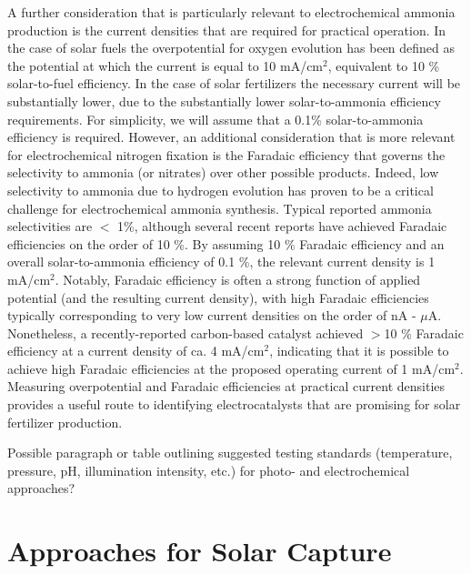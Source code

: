 A further consideration that is particularly relevant to electrochemical ammonia production is the current densities that are required for practical operation. In the case of solar fuels the overpotential for oxygen evolution has been defined as the potential at which the current is equal to 10 mA/cm$^2$, equivalent to 10 \% solar-to-fuel efficiency. In the case of solar fertilizers the necessary current will be substantially lower, due to the substantially lower solar-to-ammonia efficiency requirements. For simplicity, we will assume that a 0.1\% solar-to-ammonia efficiency is required. However, an additional consideration that is more relevant for electrochemical nitrogen fixation is the Faradaic efficiency that governs the selectivity to ammonia (or nitrates) over other possible products. Indeed, low selectivity to ammonia due to hydrogen evolution has proven to be a critical challenge for electrochemical ammonia synthesis. Typical reported ammonia selectivities are $<$ 1\%, although several recent reports have achieved Faradaic efficiencies on the order of 10 \%. By assuming 10 \% Faradaic efficiency and an overall solar-to-ammonia efficiency of 0.1 \%, the relevant current density is 1 mA/cm$^2$. Notably, Faradaic efficiency is often a strong function of applied potential (and the resulting current density), with high Faradaic efficiencies typically corresponding to very low current densities on the order of nA - $\mu$A. Nonetheless, a recently-reported carbon-based catalyst achieved $>$10 \% Faradaic efficiency at a current density of ca. 4 mA/cm$^2$, indicating that it is possible to achieve high Faradaic efficiencies at the proposed operating current of 1 mA/cm$^2$. Measuring overpotential and Faradaic efficiencies at practical current densities provides a useful route to identifying electrocatalysts that are promising for solar fertilizer production.

Possible paragraph or table outlining suggested testing standards (temperature, pressure, pH, illumination intensity, etc.) for photo- and electrochemical approaches?

\section{Approaches for Solar Capture}
\label{sec:approaches}

